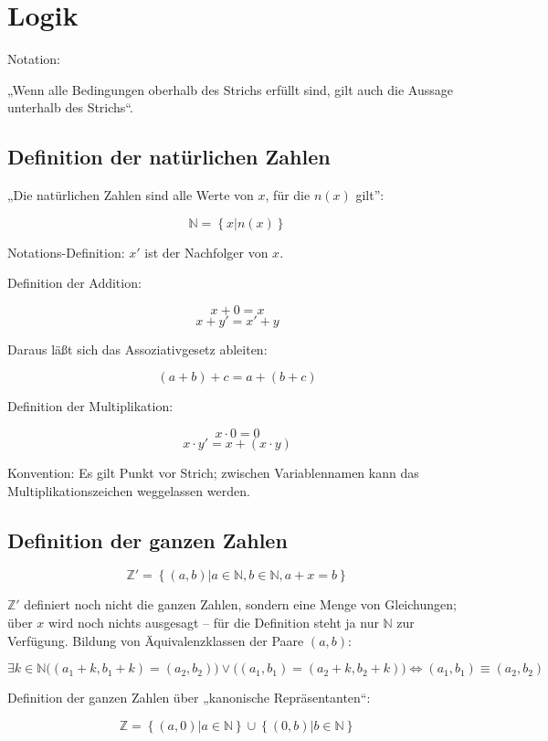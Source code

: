 \chapter{Logik}

Notation:

\begin{prooftree}
\end{prooftree}

„Wenn alle Bedingungen oberhalb des Strichs erfüllt sind, gilt auch die Aussage unterhalb des Strichs“.


\section{Definition der natürlichen Zahlen}

„Die natürlichen Zahlen sind alle Werte von $x$, für die $n(x)$ gilt”:

$$\mathbb{N} = \left\{ x | n(x) \right\}$$

Notations-Definition: $x'$ ist der Nachfolger von $x$.

Definition der Addition:

$$x+0=x$$
$$x+y'=x'+y$$

Daraus läßt sich das Assoziativgesetz ableiten:

$$(a+b)+c = a+(b+c)$$

Definition der Multiplikation:

$$x \cdot 0=0$$
$$x \cdot y'=x+(x \cdot y)$$

Konvention: Es gilt Punkt vor Strich; zwischen Variablennamen kann das Multiplikationszeichen weggelassen werden.

\section{Definition der ganzen Zahlen}

$$\mathbb{Z}' = \left\{ (a,b) | a \in \mathbb{N}, b \in \mathbb{N}, a+x=b \right\}$$

$\mathbb{Z}'$ definiert noch nicht die ganzen Zahlen, sondern eine Menge von Gleichungen; über $x$ wird noch nichts ausgesagt -- für die Definition steht ja nur $\mathbb{N}$ zur Verfügung. Bildung von Äquivalenzklassen der Paare $(a,b)$:

$$ \exists k \in \mathbb{N} \big((a_1+k,b_1+k)=(a_2,b_2)\big) \vee \big((a_1,b_1)=(a_2+k,b_2+k)\big) \iff (a_1,b_1) \equiv (a_2,b_2) $$

Definition der ganzen Zahlen über „kanonische Repräsentanten“:

$$\mathbb{Z} = \left\{ (a,0) | a \in \mathbb{N} \right\} \cup \left\{ (0,b) | b \in \mathbb{N} \right\} $$

